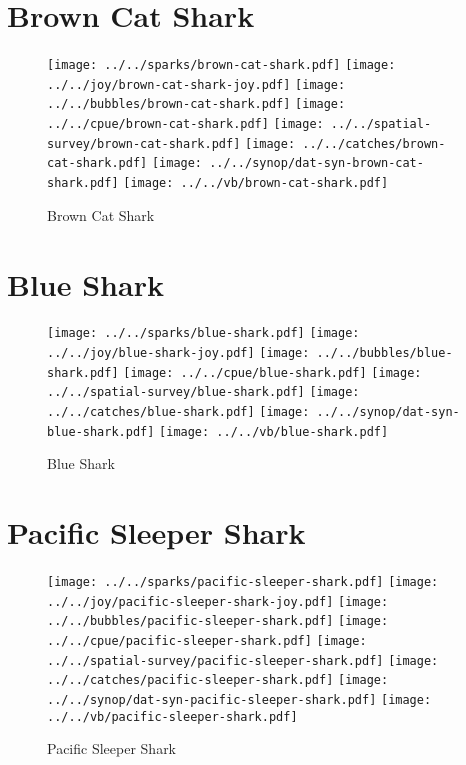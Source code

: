 \section{Brown Cat Shark}

\begin{figure}[htbp]
\centering
\texttt{[image: ../../sparks/brown-cat-shark.pdf]}
\texttt{[image: ../../joy/brown-cat-shark-joy.pdf]}
\texttt{[image: ../../bubbles/brown-cat-shark.pdf]}
\texttt{[image: ../../cpue/brown-cat-shark.pdf]}
\texttt{[image: ../../spatial-survey/brown-cat-shark.pdf]}
\texttt{[image: ../../catches/brown-cat-shark.pdf]}
\texttt{[image: ../../synop/dat-syn-brown-cat-shark.pdf]}
\texttt{[image: ../../vb/brown-cat-shark.pdf]}
\caption{Brown Cat Shark}
\end{figure}
\clearpage
\section{Blue Shark}

\begin{figure}[htbp]
\centering
\texttt{[image: ../../sparks/blue-shark.pdf]}
\texttt{[image: ../../joy/blue-shark-joy.pdf]}
\texttt{[image: ../../bubbles/blue-shark.pdf]}
\texttt{[image: ../../cpue/blue-shark.pdf]}
\texttt{[image: ../../spatial-survey/blue-shark.pdf]}
\texttt{[image: ../../catches/blue-shark.pdf]}
\texttt{[image: ../../synop/dat-syn-blue-shark.pdf]}
\texttt{[image: ../../vb/blue-shark.pdf]}
\caption{Blue Shark}
\end{figure}
\clearpage
\section{Pacific Sleeper Shark}

\begin{figure}[htbp]
\centering
\texttt{[image: ../../sparks/pacific-sleeper-shark.pdf]}
\texttt{[image: ../../joy/pacific-sleeper-shark-joy.pdf]}
\texttt{[image: ../../bubbles/pacific-sleeper-shark.pdf]}
\texttt{[image: ../../cpue/pacific-sleeper-shark.pdf]}
\texttt{[image: ../../spatial-survey/pacific-sleeper-shark.pdf]}
\texttt{[image: ../../catches/pacific-sleeper-shark.pdf]}
\texttt{[image: ../../synop/dat-syn-pacific-sleeper-shark.pdf]}
\texttt{[image: ../../vb/pacific-sleeper-shark.pdf]}
\caption{Pacific Sleeper Shark}
\end{figure}
\clearpage
